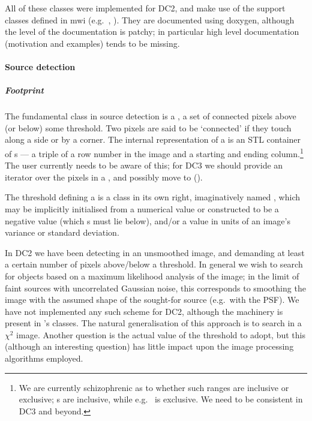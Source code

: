All of these classes were implemented for DC2, and make use of
the support classes defined in mwi (e.g.~,
).  They are documented using doxygen,
although the level of the documentation is patchy;  in particular
high level documentation (motivation and examples) tends to be missing.

\paragraph{Source detection}

\subparagraph{Footprint}
The fundamental class in source detection is a , a set
of connected pixels above (or below) some threshold. Two pixels are
said to be `connected' if they touch along a side or by a corner.  The
internal representation of a  is an STL container of
s --- a triple of a row number in the image and a starting
and ending column.\footnote{We are currently schizophrenic as to
  whether such ranges are inclusive or exclusive; s are
  inclusive, while e.g.~ is exclusive. We need
  to be consistent in DC3 and beyond.}
The user currently needs to be aware of this; for
DC3 we should provide an iterator over the pixels in a ,
and possibly move  to  ().

The threshold defining a  is a class in its own right,
imaginatively named , which may be implicitly
initialised from a numerical value or constructed to be a negative
value (which s must lie below), and/or a value
in units of an image's variance or standard deviation.

In DC2 we have been detecting in an unsmoothed image, and demanding
at least a certain number of pixels above/below a threshold.  In general
we wish to search for objects based on a maximum likelihood
analysis of the image;  in the limit of faint sources with
uncorrelated Gaussian noise, this corresponds to smoothing the
image with the assumed shape of the sought-for source (e.g.~with
the PSF).  We have not implemented any such scheme for DC2,
although the machinery is present in 's 
classes.  The natural generalisation of this approach is to
search in a $\chi^2$ image.  Another question is the actual
value of the threshold to adopt, but this (although an interesting
question) has little impact upon the image processing algorithms
employed.

